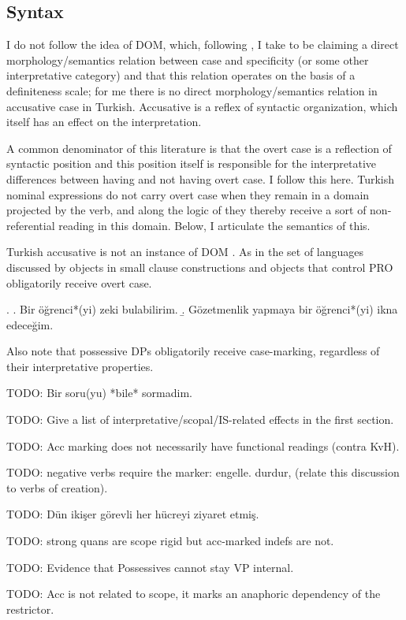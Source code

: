 \documentclass[11pt,a4paper]{article}
\begin{document}
\subsection{Syntax}

I do not follow the idea of DOM, which, following \cite{lopez12}, I take to be claiming a direct morphology/semantics relation between case and specificity (or some other interpretative category) and that this relation operates on the basis of a definiteness scale; for me there is no direct morphology/semantics relation in accusative case in Turkish. Accusative is a reflex of syntactic organization, which itself has an effect on the interpretation.


 A common denominator of this literature is that the overt case is a reflection of syntactic position and this position itself is responsible for the interpretative differences between having and not having overt case. I follow this here. Turkish nominal expressions do not carry overt case when they remain in a domain projected by the verb, and along the logic of  they thereby receive a sort of non-referential reading in this domain. Below, I articulate the semantics of this.    

Turkish accusative is not an instance of DOM \cite{aissen03}. As in the set of languages discussed by \cite{lopez12} objects in small clause constructions and objects that control PRO obligatorily receive overt case.

\ex.
\a. Bir öğrenci*(yi) zeki bulabilirim.
\b. Gözetmenlik yapmaya bir öğrenci*(yi) ikna edeceğim. 

Also note that possessive DPs obligatorily receive case-marking, regardless of their interpretative properties.

TODO: Bir soru(yu) *bile* sormadim.

TODO: Give a list of interpretative/scopal/IS-related effects in the first section.

TODO: Acc marking does not necessarily have functional readings (contra KvH).

TODO: negative verbs require the marker: engelle. durdur, (relate this discussion to verbs of creation).

TODO: Dün ikişer görevli her hücreyi ziyaret etmiş.

TODO: strong quans are scope rigid but acc-marked indefs are not.

TODO: Evidence that Possessives cannot stay VP internal.

TODO: Acc is not related to scope, it marks an anaphoric dependency of the restrictor.
\end{document}

